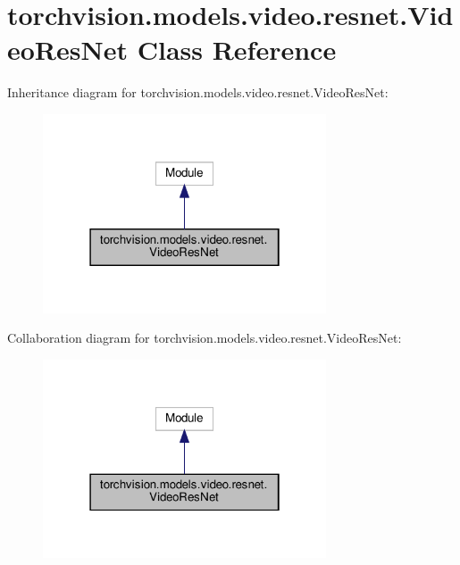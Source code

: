 \hypertarget{classtorchvision_1_1models_1_1video_1_1resnet_1_1VideoResNet}{}\section{torchvision.\+models.\+video.\+resnet.\+Video\+Res\+Net Class Reference}
\label{classtorchvision_1_1models_1_1video_1_1resnet_1_1VideoResNet}


Inheritance diagram for torchvision.\+models.\+video.\+resnet.\+Video\+Res\+Net\+:
\nopagebreak
\begin{figure}[H]
\begin{center}
\leavevmode
\includegraphics[width=238pt]{classtorchvision_1_1models_1_1video_1_1resnet_1_1VideoResNet__inherit__graph}
\end{center}
\end{figure}


Collaboration diagram for torchvision.\+models.\+video.\+resnet.\+Video\+Res\+Net\+:
\nopagebreak
\begin{figure}[H]
\begin{center}
\leavevmode
\includegraphics[width=238pt]{classtorchvision_1_1models_1_1video_1_1resnet_1_1VideoResNet__coll__graph}
\end{center}
\end{figure}
